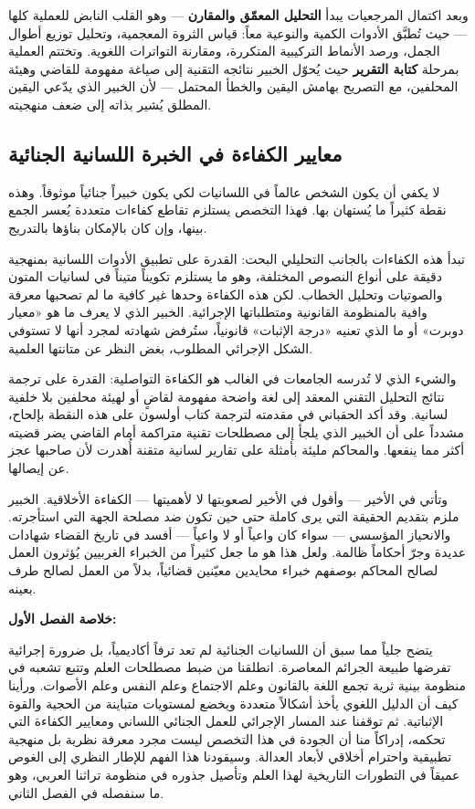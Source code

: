 وبعد اكتمال المرجعيات يبدأ \textbf{التحليل المعمّق والمقارن} — وهو القلب النابض للعملية كلها — حيث تُطبَّق الأدوات الكمية والنوعية معاً: قياس الثروة المعجمية، وتحليل توزيع أطوال الجمل، ورصد الأنماط التركيبية المتكررة، ومقارنة التواترات اللغوية. وتختتم العملية بمرحلة \textbf{كتابة التقرير} حيث يُحوّل الخبير نتائجه التقنية إلى صياغة مفهومة للقاضي وهيئة المحلفين، مع التصريح بهامش اليقين والخطأ المحتمل — لأن الخبير الذي يدّعي اليقين المطلق يُشير بذاته إلى ضعف منهجيته.

\subsection{معايير الكفاءة في الخبرة اللسانية الجنائية}

لا يكفي أن يكون الشخص عالماً في اللسانيات لكي يكون خبيراً جنائياً موثوقاً. وهذه نقطة كثيراً ما يُستهان بها. فهذا التخصص يستلزم تقاطع كفاءات متعددة يُعسر الجمع بينها، وإن كان بالإمكان بناؤها بالتدريج.

تبدأ هذه الكفاءات بالجانب التحليلي البحت: القدرة على تطبيق الأدوات اللسانية بمنهجية دقيقة على أنواع النصوص المختلفة، وهو ما يستلزم تكويناً متيناً في لسانيات المتون والصوتيات وتحليل الخطاب. لكن هذه الكفاءة وحدها غير كافية ما لم تصحبها معرفة وافية بالمنظومة القانونية ومتطلباتها الإجرائية. الخبير الذي لا يعرف ما هو «معيار دوبرت» أو ما الذي تعنيه «درجة الإثبات» قانونياً، ستُرفض شهادته لمجرد أنها لا تستوفي الشكل الإجرائي المطلوب، بغض النظر عن متانتها العلمية.

والشيء الذي لا تُدرسه الجامعات في الغالب هو الكفاءة التواصلية: القدرة على ترجمة نتائج التحليل التقني المعقد إلى لغة واضحة مفهومة لقاضٍ أو لهيئة محلفين بلا خلفية لسانية. وقد أكد الحقباني في مقدمته لترجمة كتاب أولسون على هذه النقطة بإلحاح\autocite[1]{alhaqbani2008}، مشدداً على أن الخبير الذي يلجأ إلى مصطلحات تقنية متراكمة أمام القاضي يضر قضيته أكثر مما ينفعها. والمحاكم مليئة بأمثلة على تقارير لسانية متقنة أُهدرت لأن صاحبها عجز عن إيصالها.

وتأتي في الأخير — وأقول في الأخير لصعوبتها لا لأهميتها — الكفاءة الأخلاقية. الخبير ملزم بتقديم الحقيقة التي يرى كاملة حتى حين تكون ضد مصلحة الجهة التي استأجرته. والانحياز المؤسسي — سواء كان واعياً أو لا واعياً — أفسد في تاريخ القضاء شهادات عديدة وجرّ أحكاماً ظالمة. ولعل هذا هو ما جعل كثيراً من الخبراء الغربيين يُؤثرون العمل لصالح المحاكم بوصفهم خبراء محايدين معيّنين قضائياً، بدلاً من العمل لصالح طرف بعينه.



\vspace{0.5cm}
\noindent\textbf{خلاصة الفصل الأول:}

يتضح جلياً مما سبق أن اللسانيات الجنائية لم تعد ترفاً أكاديمياً، بل ضرورة إجرائية تفرضها طبيعة الجرائم المعاصرة. انطلقنا من ضبط مصطلحات العلم وتتبع تشعبه في منظومة بينية ثرية تجمع اللغة بالقانون وعلم الاجتماع وعلم النفس وعلم الأصوات. ورأينا كيف أن الدليل اللغوي يأخذ أشكالاً متعددة ويخضع لمستويات متباينة من الحجية والقوة الإثباتية. ثم توقفنا عند المسار الإجرائي للعمل الجنائي اللساني ومعايير الكفاءة التي تحكمه، إدراكاً منا أن الجودة في هذا التخصص ليست مجرد معرفة نظرية بل منهجية تطبيقية واحترام أخلاقي لأبعاد العدالة. وسيقودنا هذا الفهم للإطار النظري إلى الغوص عميقاً في التطورات التاريخية لهذا العلم وتأصيل جذوره في منظومة تراثنا العربي، وهو ما سنفصله في الفصل الثاني.

